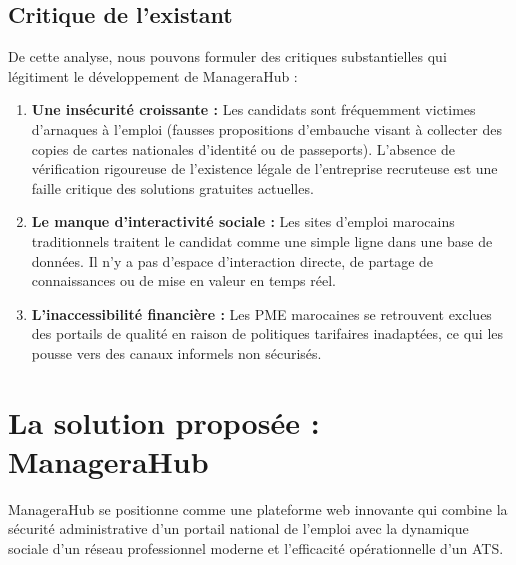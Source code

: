 \subsection{Critique de l'existant}
De cette analyse, nous pouvons formuler des critiques substantielles qui légitiment le développement de ManageraHub :
\begin{enumerate}
    \item \textbf{Une insécurité croissante :} Les candidats sont fréquemment victimes d'arnaques à l'emploi (fausses propositions d'embauche visant à collecter des copies de cartes nationales d'identité ou de passeports). L'absence de vérification rigoureuse de l'existence légale de l'entreprise recruteuse est une faille critique des solutions gratuites actuelles.
    \item \textbf{Le manque d'interactivité sociale : } Les sites d'emploi marocains traditionnels traitent le candidat comme une simple ligne dans une base de données. Il n'y a pas d'espace d'interaction directe, de partage de connaissances ou de mise en valeur en temps réel.
    \item \textbf{L'inaccessibilité financière :} Les PME marocaines se retrouvent exclues des portails de qualité en raison de politiques tarifaires inadaptées, ce qui les pousse vers des canaux informels non sécurisés.
\end{enumerate}

\section{La solution proposée : ManageraHub}
ManageraHub se positionne comme une plateforme web innovante qui combine la sécurité administrative d'un portail national de l'emploi avec la dynamique sociale d'un réseau professionnel moderne et l'efficacité opérationnelle d'un ATS.

